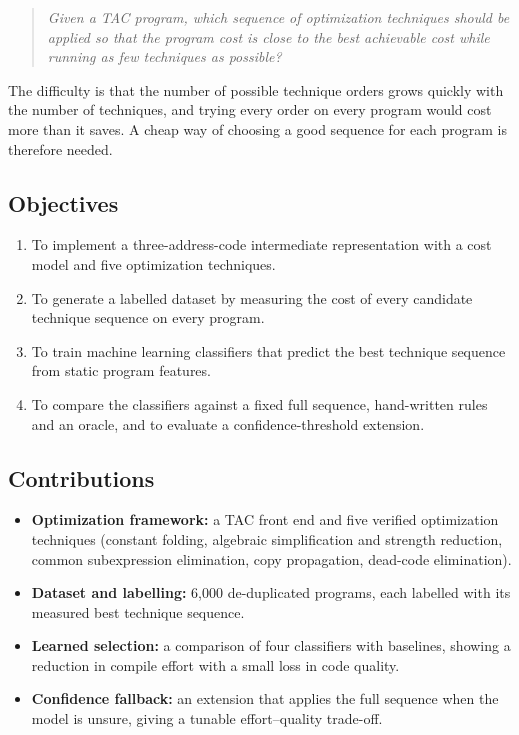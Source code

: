 \documentclass[12pt,a4paper]{article}
\begin{document}
\begin{quote}
\textit{Given a TAC program, which sequence of optimization techniques should
be applied so that the program cost is close to the best achievable cost while
running as few techniques as possible?}
\end{quote}

The difficulty is that the number of possible technique orders grows quickly with the number of techniques, and trying every order on every program would cost more than it saves. A cheap way of choosing a good sequence for each program is therefore needed.

\subsection{Objectives}

\begin{enumerate}
    \item To implement a three-address-code intermediate representation with a
    cost model and five optimization techniques.
    \item To generate a labelled dataset by measuring the cost of every
    candidate technique sequence on every program.
    \item To train machine learning classifiers that predict the best technique
    sequence from static program features.
    \item To compare the classifiers against a fixed full sequence,
    hand-written rules and an oracle, and to evaluate a confidence-threshold
    extension.
\end{enumerate}

\subsection{Contributions}

\begin{itemize}
    \item \textbf{Optimization framework:} a TAC front end and five verified
    optimization techniques (constant folding, algebraic simplification and
    strength reduction, common subexpression elimination, copy propagation,
    dead-code elimination).
    \item \textbf{Dataset and labelling:} 6{,}000 de-duplicated programs, each
    labelled with its measured best technique sequence.
    \item \textbf{Learned selection:} a comparison of four classifiers with
    baselines, showing a reduction in compile effort with a small loss in code
    quality.
    \item \textbf{Confidence fallback:} an extension that applies the full
    sequence when the model is unsure, giving a tunable effort--quality
    trade-off.
\end{itemize}
\end{document}

